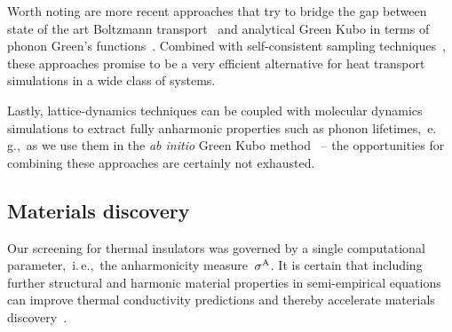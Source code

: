 Worth noting are more recent approaches that try to bridge the gap between state of the art Boltzmann transport~\cite{Simoncelli2019} and analytical Green Kubo in terms of phonon Green's functions~\cite{isaeva2019,dangic2021}. Combined with self-consistent sampling techniques~\cite{brown2013}, these approaches promise to be a very efficient alternative for heat transport simulations in a wide class of systems.

Lastly, lattice-dynamics techniques can be coupled with molecular dynamics simulations to extract fully anharmonic properties such as phonon lifetimes,~e.\,g.,~as we use them in the \emph{ab initio} Green Kubo method~\cite{Ladd1986,Turney2009,Zhang2014,Carbogno2016,Glensk2019} -- the opportunities for combining these approaches are certainly not exhausted.

\subsection{Materials discovery}
Our screening for thermal insulators was governed by a single computational parameter,~i.\,e.,~the anharmonicity measure~$\sigma^\mathrm{A}$. It is certain that including further structural and harmonic material properties in semi-empirical equations can improve thermal conductivity predictions and thereby accelerate materials discovery~\cite{ouyang2018,goldsmith2017,Chen2019,Purcell2021}.


